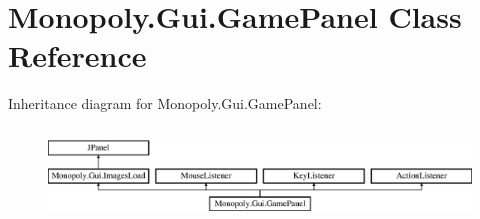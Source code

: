 \hypertarget{class_monopoly_1_1_gui_1_1_game_panel}{}\section{Monopoly.\+Gui.\+Game\+Panel Class Reference}
\label{class_monopoly_1_1_gui_1_1_game_panel}
Inheritance diagram for Monopoly.\+Gui.\+Game\+Panel\+:\begin{figure}[H]
\begin{center}
\leavevmode
\includegraphics[height=2.470588cm]{class_monopoly_1_1_gui_1_1_game_panel}
\end{center}
\end{figure}
